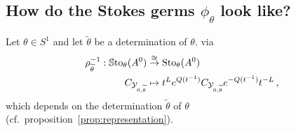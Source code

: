 \subsection{How do the Stokes germs $\phi_\theta$ look like?}
Let $\theta\in S^1$ and let $\tilde\theta$ be a determination of $\theta$.
via
\begin{align*}
  \rho_{\widetilde\theta}^{-1}:
  \operatorname{\mathbb{S}to}_\theta(A^0)
  &\overset{\cong}\to
  \operatorname{Sto}_\theta(A^0)
  \\C_{\mathcal{Y}_{0,\widetilde\theta}} &\mapsto
  t^{L}e^{Q(t^{-1})}C_{\mathcal{Y}_{0,\widetilde\theta}} e^{-Q(t^{-1})}t^{-L} \,,
\end{align*}
which depends on the determination $\tilde\theta$ of $\theta$ 
(cf.\ proposition~\ref{prop:representation}).

